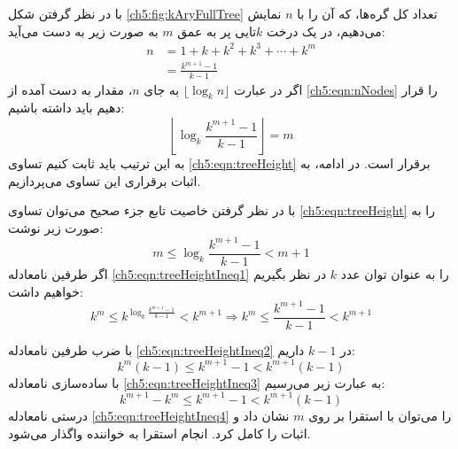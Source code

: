 با در نظر گرفتن شکل {\eqref{ch5:fig:kAryFullTree}} تعداد کل گره‌ها، که آن را با {$n$} نمایش می‌دهیم، در یک درخت {$k$}تایی پر به عمق {$m$} به صورت زیر به دست می‌آید:
\begin{align}
n &= 1+k+k^2+k^3+\cdots + k^m\nonumber\\
   &=\frac{k^{m+1}-1}{k-1}\label{ch5:eqn:nNodes}
\end{align}
اگر در عبارت {$\lfloor \log_k n \rfloor$} به جای {$n$}، مقدار به دست آمده از {\eqref{ch5:eqn:nNodes}} را قرار دهیم باید داشته باشیم:
\begin{equation}
\left\lfloor \log_k \frac{k^{m+1}-1}{k-1} \right\rfloor=m\label{ch5:eqn:treeHeight}
\end{equation}
به این ترتیب باید ثابت کنیم تساوی {\eqref{ch5:eqn:treeHeight}} برقرار است. در ادامه، به اثبات برقراری این تساوی می‌پردازیم.

با در نظر گرفتن خاصیت تابع جزء صحیح می‌توان تساوی {\eqref{ch5:eqn:treeHeight}} را به صورت زیر نوشت:
\begin{equation}
m \leq \log_k \frac{k^{m+1}-1}{k-1} < m+1\label{ch5:eqn:treeHeightIneq1}
\end{equation}
اگر طرفین نامعادله {\eqref{ch5:eqn:treeHeightIneq1}} را به عنوان توان عدد {$k$} در نظر بگیریم خواهیم داشت:
\begin{equation}
k^m \leq k^{\log_k \frac{k^{m+1}-1}{k-1}} < k^{m+1} \Rightarrow k^m \leq \frac{k^{m+1}-1}{k-1} < k^{m+1}\label{ch5:eqn:treeHeightIneq2}
\end{equation}

با ضرب طرفین نامعادله {\eqref{ch5:eqn:treeHeightIneq2}} در {$k-1$} داریم:
\begin{equation}
k^m(k-1) \leq k^{m+1}-1 < k^{m+1}(k-1)\label{ch5:eqn:treeHeightIneq3}
\end{equation}
با ساده‌سازی نامعادله {\eqref{ch5:eqn:treeHeightIneq3}} به عبارت زیر می‌رسیم:
\begin{equation}
k^{m+1}-k^m \leq k^{m+1}-1 < k^{m+1}(k-1)\label{ch5:eqn:treeHeightIneq4}
\end{equation}
درستی نامعادله {\ref{ch5:eqn:treeHeightIneq4}} را می‌توان با استقرا بر روی {$m$} نشان داد و اثبات را کامل کرد. انجام استقرا به خواننده واگذار می‌شود.

